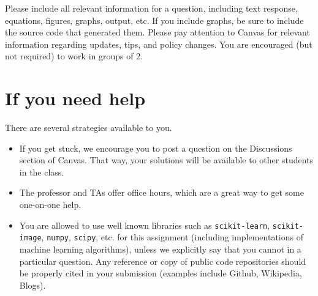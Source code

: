 \begin{framed}
Please include all relevant information for a question, including text response, equations, figures, graphs, output, etc. If you include graphs, be sure to include the source code that generated them. Please pay attention to Canvas for relevant information regarding updates, tips, and policy changes. You are encouraged (but not required) to work in groups of 2.
\end{framed}

\section*{If you need help}
There are several strategies available to you.
\begin{itemize}
\item If you get stuck, we encourage you to post a question  on the Discussions section of Canvas. That way, your solutions will be available to other students in the class.
\item The professor and TAs offer office hours, which are a great way to get some one-on-one help.
\item You are allowed to use well known libraries such as \verb+scikit-learn+, \verb+scikit-image+, \verb+numpy+, \verb+scipy+, etc. for this assignment (including implementations of machine learning algorithms), unless we explicitly say that you cannot in a particular question. Any reference or copy of public code repositories should be properly cited in your submission (examples include Github, Wikipedia, Blogs).
\end{itemize}
